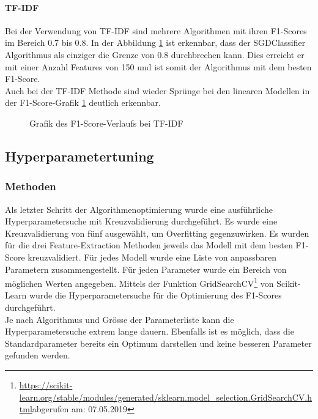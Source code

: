 \paragraph{TF-IDF}
Bei der Verwendung von TF-IDF sind mehrere Algorithmen mit ihren F1-Scores im Bereich 0.7 bis 0.8.
In der Abbildung \cref{abb:tfidf-f1} ist erkennbar, dass der SGDClassifier Algorithmus als einziger die Grenze von 0.8 durchbrechen kann.
Dies erreicht er mit einer Anzahl Features von 150 und ist somit der Algorithmus mit dem besten F1-Score.\\
Auch bei der TF-IDF Methode sind wieder Sprünge bei den linearen Modellen in der F1-Score-Grafik \cref{abb:tfidf-f1} deutlich erkennbar.
\begin{figure}[H]	
	\setlength{\fboxsep}{0.3pt} 
	\setlength{\fboxrule}{0.3pt} 
	\caption{Grafik des F1-Score-Verlaufs bei TF-IDF}
	\label{abb:tfidf-f1}
\end{figure}
\subsection{Hyperparametertuning}
\subsubsection{Methoden}
Als letzter Schritt der Algorithmenoptimierung wurde eine ausführliche Hyperparametersuche mit Kreuzvalidierung durchgeführt.
Es wurde eine Kreuzvalidierung von fünf ausgewählt, um Overfitting gegenzuwirken.
Es wurden für die drei Feature-Extraction Methoden jeweils das Modell mit dem besten F1-Score kreuzvalidiert.
Für jedes Modell wurde eine Liste von anpassbaren Parametern zusammengestellt.
Für jeden Parameter wurde ein Bereich von möglichen Werten angegeben.
Mittels der Funktion \glqq GridSearchCV\grqq{}\footnote{\url{https://scikit-learn.org/stable/modules/generated/sklearn.model_selection.GridSearchCV.html}abgerufen am: 07.05.2019} von Scikit-Learn wurde die Hyperparametersuche für die Optimierung des F1-Scores durchgeführt.\\
Je nach Algorithmus und Grösse der Parameterliste kann die Hyperparametersuche extrem lange dauern.
Ebenfalls ist es möglich, dass die Standardparameter bereits ein Optimum darstellen und keine besseren Parameter gefunden werden.
